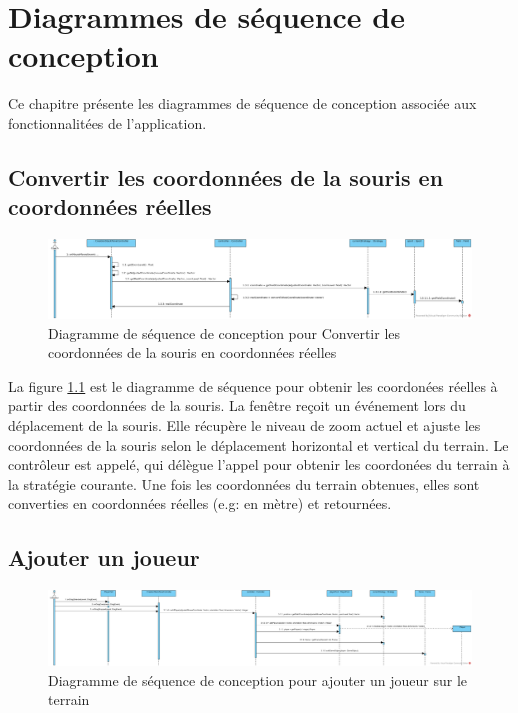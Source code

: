 
\chapter{Diagrammes de séquence de conception}
\label{s:sequence_conception}

Ce chapitre présente les diagrammes de séquence de conception associée aux fonctionnalitées de l'application.

\section{Convertir les coordonnées de la souris en coordonnées réelles}
\label{sec:convertir_coordonnees_souris}

\begin{figure}[htpb]
    \centering
    \includegraphics[scale=0.32]{fig/dsc_get_real_coordinate.png}
    \caption{Diagramme de séquence de conception pour Convertir les coordonnées de la souris en coordonnées réelles}
    \label{fig:dsc_pixel_reel}
\end{figure}

La figure \ref{fig:dsc_pixel_reel} est le diagramme de séquence pour obtenir les coordonées réelles à partir des coordonnées de la souris.
La fenêtre reçoit un événement lors du déplacement de la souris.
Elle récupère le niveau de zoom actuel et ajuste les coordonnées de la souris selon le déplacement horizontal et vertical du terrain.
Le contrôleur est appelé, qui délègue l'appel pour obtenir les coordonées du terrain à la stratégie courante.
Une fois les coordonnées du terrain obtenues, elles sont converties en coordonnées réelles (e.g: en mètre) et retournées.


\section{Ajouter un joueur}
\label{sec:ajouter_joueur}

\begin{figure}[htpb]
    \centering
    \includegraphics[scale=0.28]{fig/dsc_create_player.png}
    \caption{Diagramme de séquence de conception pour ajouter un joueur sur le terrain}
    \label{fig:dsc_create_player}
\end{figure}

